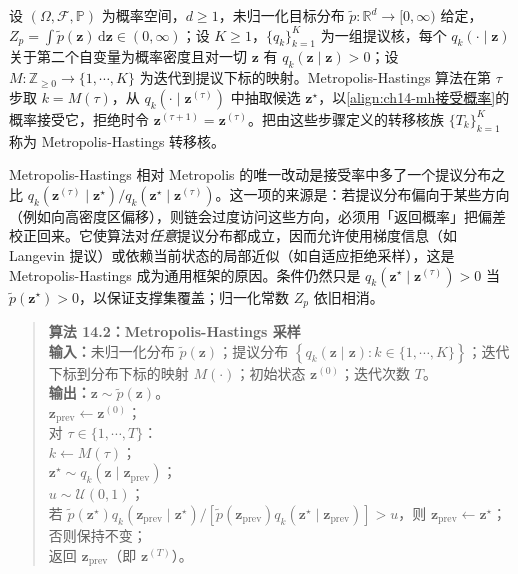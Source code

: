 \documentclass[../../main.tex]{subfiles}
\begin{document}
\begin{definition}\label{definition:ch14-Metropolis-Hastings算法}
设 $(\Omega,\mathcal{F},\mathbb{P})$ 为概率空间，$d\geqslant1$，未归一化目标分布 $\widetilde{p}:\mathbb{R}^{d}\to[0,\infty)$ 给定，$Z_{p}=\int\widetilde{p}(\bm{z})\,\mathrm{d}\bm{z}\in(0,\infty)$；设 $K\geqslant1$，$\{q_{k}\}_{k=1}^{K}$ 为一组提议核，每个 $q_{k}(\cdot\mid\bm{z})$ 关于第二个自变量为概率密度且对一切 $\bm{z}$ 有 $q_{k}(\bm{z}\mid\bm{z})>0$；设 $M:\mathbb{Z}_{\geqslant0}\to\{1,\cdots,K\}$ 为迭代到提议下标的映射。Metropolis-Hastings 算法在第 $\tau$ 步取 $k=M(\tau)$，从 $q_{k}(\cdot\mid\bm{z}^{(\tau)})$ 中抽取候选 $\bm{z}^{\star}$，以\eqref{align:ch14-mh接受概率}的概率接受它，拒绝时令 $\bm{z}^{(\tau+1)}=\bm{z}^{(\tau)}$。把由这些步骤定义的转移核族 $\{T_{k}\}_{k=1}^{K}$ 称为 Metropolis-Hastings 转移核。
\end{definition}

\begin{remark}Metropolis-Hastings 相对 Metropolis 的唯一改动是接受率中多了一个提议分布之比 $q_{k}\!\left(\bm{z}^{(\tau)}\mid\bm{z}^{\star}\right)/q_{k}\!\left(\bm{z}^{\star}\mid\bm{z}^{(\tau)}\right)$。这一项的来源是：若提议分布偏向于某些方向（例如向高密度区偏移），则链会过度访问这些方向，必须用「返回概率」把偏差校正回来。它使算法对\emph{任意}提议分布都成立，因而允许使用梯度信息（如 Langevin 提议）或依赖当前状态的局部近似（如自适应拒绝采样），这是 Metropolis-Hastings 成为通用框架的原因。条件仍然只是 $q_{k}\!\left(\bm{z}^{\star}\mid\bm{z}^{(\tau)}\right)>0$ 当 $\widetilde{p}\!\left(\bm{z}^{\star}\right)>0$，以保证支撑集覆盖；归一化常数 $Z_{p}$ 依旧相消。
\end{remark}

\begin{quote}
\small
\textbf{算法 14.2：Metropolis-Hastings 采样}\\
\textbf{输入：}未归一化分布 $\widetilde{p}(\bm{z})$；提议分布 $\left\{q_{k}\!\left(\bm{z}\mid\bm{z}\right):k\in\{1,\cdots,K\}\right\}$；迭代下标到分布下标的映射 $M(\cdot)$；初始状态 $\bm{z}^{(0)}$；迭代次数 $T$。\\
\textbf{输出：}$\bm{z}\sim\widetilde{p}(\bm{z})$。\\
$\bm{z}_{\mathrm{prev}}\leftarrow\bm{z}^{(0)}$；\\
对 $\tau\in\{1,\cdots,T\}$：\\
\quad $k\leftarrow M(\tau)$；\\
\quad $\bm{z}^{\star}\sim q_{k}\!\left(\bm{z}\mid\bm{z}_{\mathrm{prev}}\right)$；\\
\quad $u\sim\mathcal{U}(0,1)$；\\
\quad 若 $\widetilde{p}\!\left(\bm{z}^{\star}\right)q_{k}\!\left(\bm{z}_{\mathrm{prev}}\mid\bm{z}^{\star}\right)/\left[\widetilde{p}\!\left(\bm{z}_{\mathrm{prev}}\right)q_{k}\!\left(\bm{z}^{\star}\mid\bm{z}_{\mathrm{prev}}\right)\right]>u$，则 $\bm{z}_{\mathrm{prev}}\leftarrow\bm{z}^{\star}$；否则保持不变；\\
返回 $\bm{z}_{\mathrm{prev}}$（即 $\bm{z}^{(T)}$）。
\end{quote}
\end{document}
